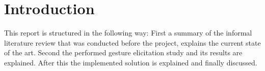 
\chapter{Introduction}

This report is structured in the following way: First a summary of the informal literature review that was conducted before the project, explains the current state of the art. Second the performed gesture elicitation study and its results are explained. After this the implemented solution is explained and finally discussed.





